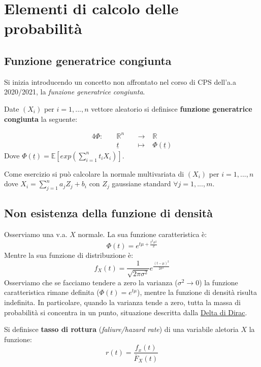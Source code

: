 \section{Elementi di calcolo delle probabilità}
\subsection{Funzione generatrice congiunta}
Si inizia introducendo un concetto non affrontato nel corso di CPS dell'a.a 2020/2021, la \textit{funzione generatrice congiunta}.

\begin{definition}
Date $(X_i)$ per $i=1,...,n$ vettore aleatorio si definisce \textbf{funzione generatrice congiunta} la seguente:

    \begin{alignat}{4}
\Phi:\; && \mathbb{R}^n && \;\to\;     & \mathbb{R} \\
     && \underline{t}    && \;\mapsto\; & \Phi(\underline{t})
\end{alignat}
Dove $\Phi(\underline{t})=\mathbb{E}[exp(\sum_{i=1}^nt_iX_i)]$.
\end{definition}

Come esercizio si può calcolare la normale multivariata di $(X_i)$ per $i=1,...,n$ dove $X_i=\sum_{j=1}^na_jZ_j+b_i$ con $Z_j$ gaussiane standard $\forall j=1,...,m$.

\subsection{Non esistenza della funzione di densità}
Osserviamo una v.a. $X$ normale. La sua funzione caratteristica è:
\begin{equation} \label{char_N}
    \Phi(t)=e^{t\mu+\frac{t^2\sigma^2}{2}}
\end{equation}
Mentre la sua funzione di distribuzione è:
\begin{equation}
    f_X(t)=\frac{1}{\sqrt{2\pi \sigma^2}}e^{\frac{(t-\mu)^2}{2\sigma^2}}
\end{equation}
Osserviamo che se facciamo tendere a zero la varianza ($\sigma^2\rightarrow 0$) la funzione caratteristica rimane definita ($\Phi(t)=e^{t\mu}$), mentre la funzione di densità risulta indefinita. In particolare, quando la varianza tende a zero, tutta la massa di probabilità si concentra in un punto, situazione descritta dalla \href{https://en.wikipedia.org/wiki/Dirac_delta_function}{Delta di Dirac}.

\begin{definition}
Si definisce \textbf{tasso di rottura} (\textit{faliure/hazard rate}) di una variabile aletoria $X$ la funzione:
\[r(t)=\frac{f_x(t)}{\overline{F}_X(t)}\]
\end{definition}

